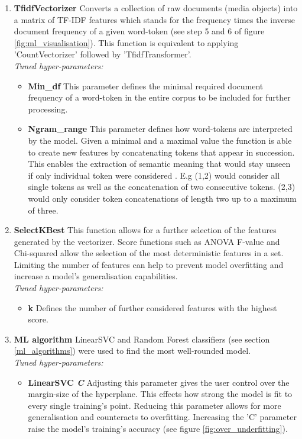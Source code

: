 \begin{enumerate}
    \item \textbf{TfidfVectorizer} Converts a collection of raw documents (media objects) into a matrix of TF-IDF features which stands for the frequency times the inverse document frequency of a given word-token (see step 5 and 6 of figure \ref{fig:ml_visualisation}). This function is equivalent to applying 'CountVectorizer' followed by 'TfidfTransformer'.\\
    \textit{Tuned hyper-parameters:}
    \begin{itemize}[label={}]
        \item \textbf{Min\_df} This parameter defines the minimal required document frequency of a word-token in the entire corpus to be included for further processing.
        \item \textbf{Ngram\_range} This parameter defines how word-tokens are interpreted by the model. Given a minimal and a maximal value the function is able to create new features by concatenating tokens that appear in succession. This enables the extraction of semantic meaning that would stay unseen if only individual token were considered \parencite{Surtikanti2013}. E.g (1,2) would consider all single tokens as well as the concatenation of two consecutive tokens. (2,3) would only consider token concatenations of length two up to a maximum of three.
    \end{itemize}
    
    \item \textbf{SelectKBest} This function allows for a further selection of the features generated by the vectorizer. Score functions such as ANOVA F-value and Chi-squared allow the selection of the most deterministic features in a set. Limiting the number of features can help to prevent model overfitting and increase a model's generalisation capabilities.\\
    \textit{Tuned hyper-parameters:}
    \begin{itemize}[label={}]
        \item \textbf{k} Defines the number of further considered features with the highest score.
    \end{itemize}
    
    \item \textbf{ML algorithm} LinearSVC and Random Forest classifiers (see section \ref{ml_algorithms}) were used to find the most well-rounded model.\\
    \textit{Tuned hyper-parameters:}
    \begin{itemize}[label={}]
        \item \textbf{LinearSVC \textit{C}} Adjusting this parameter gives the user control over the margin-size of the hyperplane. This effects how strong the model is fit to every single training's point. Reducing this parameter allows for more generalisation and counteracts to overfitting. Increasing the 'C' parameter raise the model's training's accuracy (see figure \ref{fig:over_underfitting}).
        

\end{itemize}
\end{enumerate}

